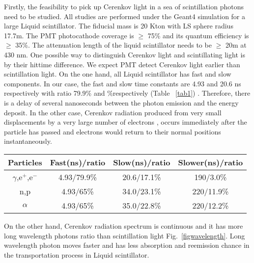 \documentclass[a4paper,10pt]{cpc-hepnp}
\begin{document}
Firstly, the feasibility to pick up Cerenkov light in a sea of scintillation photons
need to be studied.
All studies are performed under the Geant4 simulation for a large Liquid
scintillator.
The fiducial mass is 20 Kton with LS sphere radius 17.7m.
The PMT photocathode coverage is $\ge$ 75\% and its
quantum efficiency is
$\ge$ 35\%. The attenuation length of the liquid scintillator needs to be $\ge$ 20m at 430 nm.
One possible way to distinguish Cerenkov light and scintillating light is by their hittime
difference\cite{lab2}. We expect PMT detect Cerenkov light earlier than scintillation light.
On the one hand, all Liquid scintillator has fast and slow components. In our
case, the fast and slow time constants are 4.93 and 20.6 ns respectively with
ratio  79.9\% and \%respectively (Table ~\ref{tab1}) .
Therefore, there is a delay of several nanoseconds between the photon emission and the energy deposit.
In the other case, Cerenkov radiation produced from very small displacements by a very large number of electrons
, occurs immediately after the particle has passed and electrons would return to their normal positions
 instantaneously\cite{special_article}.
\begin{center}
\footnotesize
\begin{tabular*}{100mm}{@{\extracolsep{\fill}}cccc}
\toprule Particles & Fast(ns)/ratio & Slow(ns)/ratio &Slower(ns)/ratio \\
\hline
$\gamma$,e$^+$,e$^-$&4.93/79.9\%&20.6/17.1\%&190/3.0\% \\
n,p&4.93/65\%&34.0/23.1\%&220/11.9\% \\
$\alpha$&4.93/65\%&35.0/22.8\%&220/12.2\%\\
\bottomrule
\end{tabular*}
\end{center}
On the other hand, Cerenkov radiation spectrum is continuous and it has more
long wavelength
photons ratio than scintillation light Fig.~\ref{figwavelength}. Long
wavelength photon moves faster and has less absorption
and reemission chance in the transportation process in Liquid scintillator.
\end{document}
